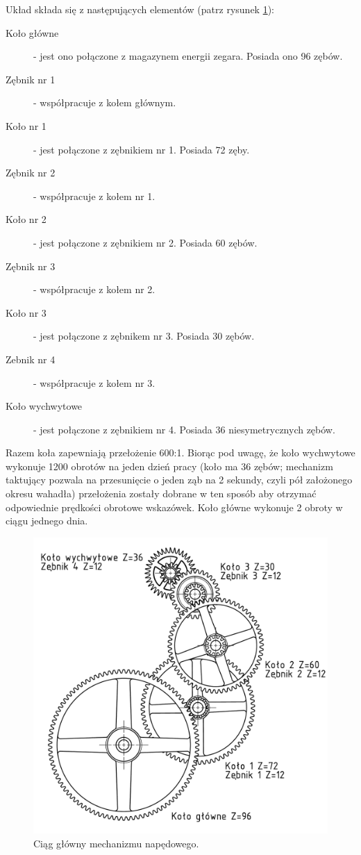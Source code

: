   				Układ składa się z następujących elementów (patrz rysunek \ref{fig:kacpermechanizmassmdwg1}):
  				\begin{description}
  					\item[Koło główne] - jest ono połączone z magazynem energii zegara. Posiada ono 96 zębów.
  					\item[Zębnik nr 1] - współpracuje z kołem głównym.
  					\item[Koło nr 1] - jest połączone z zębnikiem nr 1. Posiada 72 zęby.
  					\item[Zębnik nr 2] - współpracuje z kołem nr 1.
  					\item[Koło nr 2] - jest połączone z zębnikiem nr 2. Posiada 60 zębów.
  					\item[Zębnik nr 3] - współpracuje z kołem nr 2.
  					\item[Koło nr 3] - jest połączone z zębnikem nr 3. Posiada 30 zębów.
  					\item[Zebnik nr 4] - współpracuje z kołem nr 3.
  					\item[Koło wychwytowe] - jest połączone z zębnikiem nr 4. Posiada 36 niesymetrycznych zębów.
  				\end{description}
  				Razem koła zapewniają przełożenie 600:1.
  				Biorąc pod uwagę, że koło wychwytowe wykonuje 1200 obrotów na jeden dzień pracy (koło ma 36 zębów; mechanizm taktujący pozwala na przesunięcie o jeden ząb na 2 sekundy, czyli pół założonego okresu wahadła) przełożenia zostały dobrane w ten sposób aby otrzymać odpowiednie prędkości obrotowe wskazówek.
  				Koło główne wykonuje 2 obroty w ciągu jednego dnia.
  				\begin{figure}
  					\centering
  					\includegraphics[width=\linewidth]{Projekt/ciag_glowny}
  					\caption{Ciąg główny mechanizmu napędowego.}
  					\label{fig:kacpermechanizmassmdwg1}
  				\end{figure}
  				
